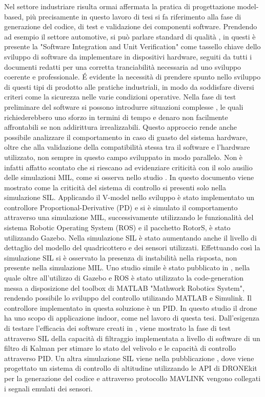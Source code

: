 Nel settore industriare risulta ormai affermata la pratica di progettazione model-based, più precisamente in questo lavoro di tesi si fa riferimento alla fase di generazione del codice, di test e validazione dei componenti software. Prendendo ad esempio il settore automotive, si può parlare standard di qualità \cite{iso26262}, in questi è presente la "Software Integration and Unit Verification" come tassello chiave dello sviluppo di software da implementare in dispositivi hardware, seguiti da tutti i documenti redatti per una corretta tranciabilità necessaria ad uno sviluppo coerente e professionale. \'E evidente la necessità di prendere spunto nello sviluppo di questi tipi di prodotto alle pratiche industriali, in modo da soddisfare diversi criteri come la sicurezza nelle varie condizioni operative. Nella fase di test preliminare del software si possono introdurre situazioni complesse \cite{MIL_Auto}, le quali richiederebbero uno sforzo in termini di tempo e denaro non facilmente affrontabili se non addirittura irrealizzabili. Questo approccio rende anche possibile analizzare il comportamento in caso di guasto del sistema hardware, oltre che alla validazione della compatibilità stessa tra il software e l'hardware utilizzato, non sempre in questo campo sviluppato in modo parallelo.
Non è infatti affatto scontato che si riescano ad evidenziare criticità con il solo ausilio delle simulazioni MIL, come si osserva nello studio \cite{SIL_Improv}. In questo documento viene mostrato come la criticità del sistema di controllo si presenti solo nella simulazione SIL. Applicando il V-model nello sviluppo è stato implementato un controllore Proportional-Derivative (PD) e si è simulato il comportamento attraverso una simulazione MIL, successivamente utilizzando le funzionalità del sistema Robotic Operating System (ROS) e il pacchetto RotorS, è stato utilizzando Gazebo. Nella simulazione SIL è stato aumentando anche il livello di dettaglio del modello del quadricottero e dei sensori utilizzati. Effettuando così la simulazione SIL si è osservato la presenza di instabilità nella risposta, non presente nella simulazione MIL.
Uno studio simile è stato pubblicato in \cite{CrazyS}, nella quale oltre all'utilizzo di Gazebo e ROS è stato utilizzato la code-generation messa a disposizione del toolbox di MATLAB "Mathwork Robotics System", rendendo possibile lo sviluppo del controllo utilizando MATLAB e Simulink. Il controllore implementato in questa soluzione è un PID. In questo studio il drone ha uno scopo di applicazione indoor, come nel lavoro di questa tesi.
Dall'esigenza di testare l'efficacia dei software creati in \cite{SIL_perform}, viene mostrato la fase di test attraverso SIL della capacità di filtraggio implementata a livello di software di un filtro di Kalman per stimare lo stato del velivolo e le capacità di controllo attraverso PID. Un altra simulazione SIL viene nella pubblicazione \cite{SIL_design}, dove viene progettato un sistema di controllo di altitudine utilizzando le API di DRONEkit per la generazione del codice e attraverso protocollo MAVLINK vengono collegati i segnali emulati dei sensori.

